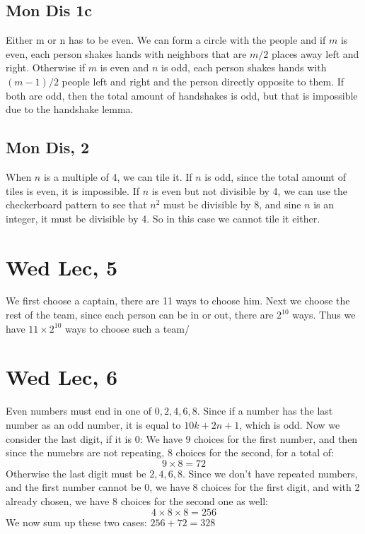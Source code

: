 \documentclass[12pt]{article}
\begin{document}
\subsection{Mon Dis 1c}
Either m or n has to be even. We can form a circle with the people and if $m$ is even, each person shakes hands with neighbors that are $m/2$ places away left and right. Otherwise if $m$ is even and $n$ is odd, each person shakes hands with $(m-1)/2$ people left and right and the person directly opposite to them.
\newline
If both are odd, then the total amount of handshakes is odd, but that is impossible due to the handshake lemma.


\subsection{Mon Dis, 2}
When $n$ is a multiple of 4, we can tile it.
\newline
If $n$ is odd, since the total amount of tiles is even, it is impossible.
\newline
If $n$ is even but not divisible by 4, we can use the checkerboard pattern to see that $n^2$ must be divisible by 8, and sine $n$ is an integer, it must be divisible by 4. So in this case we cannot tile it either.

\section{Wed Lec, 5}
We first choose a captain, there are 11 ways to choose him.
\newline
Next we choose the rest of the team, since each person can be in or out, there are $2^{10}$ ways.
\newline
Thus we have $11 \times 2^{10}$ ways to choose such a team/

\section{Wed Lec, 6}
Even numbers must end in one of $0, 2, 4, 6, 8$. Since if a number has the last number as an odd number, it is equal to $10k + 2n+1$, which is odd.
\newline
Now we consider the last digit, if it is $0$:
\newline
We have 9 choices for the first number, and then since the numebrs are not repeating, 8 choices for the second, for a total of:
$$9 \times 8 = 72$$
Otherwise the last digit must be $2, 4, 6, 8$. Since we don't have repeated numbers, and the first number cannot be $0$, we have 8 choices for the first digit, and with 2 already chosen, we have 8 choices for the second one as well:
$$4 \times 8 \times 8 = 256$$
We now sum up these two cases: $256 + 72 = 328$
\end{document}
